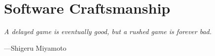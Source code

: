 \part{Software Craftsmanship}

\vspace{4mm}
\begin{displayquote}
    \textit{A delayed game is eventually good, but a rushed game is forever bad.}
    \vspace{2mm}
    \begin{flushright}
        ---Shigeru Miyamoto
    \end{flushright}
\end{displayquote}
\vspace{4mm}







